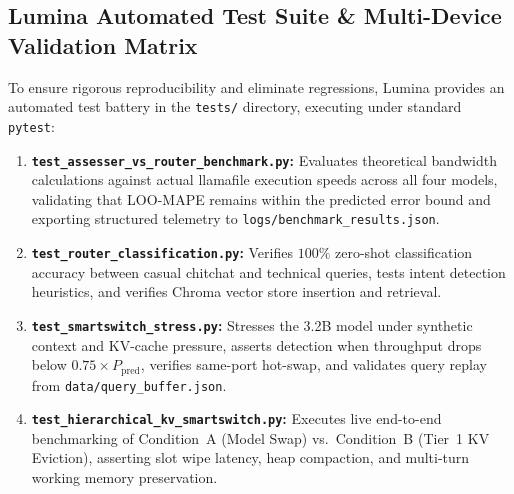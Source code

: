 \documentclass[11pt,a4paper]{article}
\newcommand{\Ppred}{P_{\mathrm{pred}}}
\newcommand{\code}[1]{\texttt{#1}}
\begin{document}
\subsection{Lumina Automated Test Suite \& Multi-Device Validation Matrix}\label{sec:test_suite_matrix}
To ensure rigorous reproducibility and eliminate regressions, Lumina provides an automated test battery in the \code{tests/} directory, executing under standard \code{pytest}:
\begin{enumerate}[leftmargin=*]
  \item \textbf{\code{test\_assesser\_vs\_router\_benchmark.py}:} Evaluates theoretical bandwidth calculations against actual llamafile execution speeds across all four models, validating that LOO-MAPE remains within the predicted error bound and exporting structured telemetry to \code{logs/benchmark\_results.json}.
  \item \textbf{\code{test\_router\_classification.py}:} Verifies $100\%$ zero-shot classification accuracy between casual chitchat and technical queries, tests intent detection heuristics, and verifies Chroma vector store insertion and retrieval.
  \item \textbf{\code{test\_smartswitch\_stress.py}:} Stresses the 3.2B model under synthetic context and KV-cache pressure, asserts detection when throughput drops below $0.75 \times \Ppred$, verifies same-port hot-swap, and validates query replay from \code{data/query\_buffer.json}.
  \item \textbf{\code{test\_hierarchical\_kv\_smartswitch.py}:} Executes live end-to-end benchmarking of Condition~A (Model Swap) vs.\ Condition~B (Tier~1 KV Eviction), asserting slot wipe latency, heap compaction, and multi-turn working memory preservation.
\end{enumerate}
\end{document}
